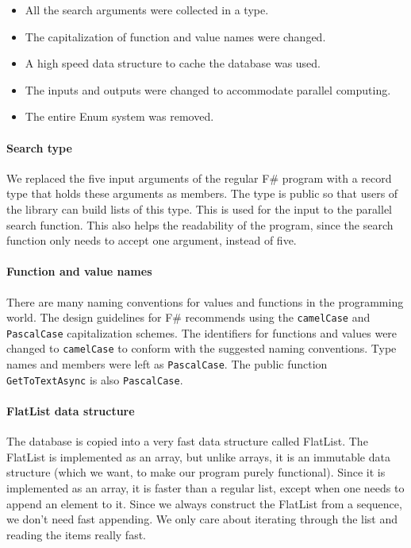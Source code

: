 \documentclass[12pt, a4paper]{article}
\newcommand{\code}[1]{{\small \texttt{#1}}}
\begin{document}
\begin{itemize}
	\item All the search arguments were collected in a type.
	\item The capitalization of function and value names were changed.
	\item A high speed data structure to cache the database was used.
	\item The inputs and outputs were changed to accommodate parallel computing.
	\item The entire Enum system was removed.
\end{itemize}

\paragraph{Search type} We replaced the five input arguments of the regular F\# program with a record type that holds these arguments as members. The type is public so that users of the library can build lists of this type. This is used for the input to the parallel search function. This also helps the readability of the program, since the search function only needs to accept one argument, instead of five.

\paragraph{Function and value names} There are many naming conventions for values and functions in the programming world. The design guidelines for F\# recommends using the \code{camelCase} and \code{PascalCase} capitalization schemes. The identifiers for functions and values were changed to \code{camelCase} to conform with the suggested naming conventions. Type names and members were left as \code{PascalCase}. The public function \code{GetToTextAsync} is also \code{PascalCase}.

\newpage

\paragraph{FlatList data structure} The database is copied into a very fast data structure called FlatList. The FlatList is implemented as an array, but unlike arrays, it is an immutable data structure (which we want, to make our program purely functional). Since it is implemented as an array, it is faster than a regular list, except when one needs to append an element to it. Since we always construct the FlatList from a sequence, we don't need fast appending. We only care about iterating through the list and reading the items really fast.
\end{document}
